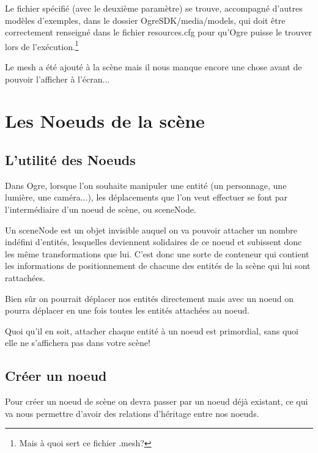 \documentclass[10pt,a4paper]{report}
\begin{document}
Le fichier sp\'ecifi\'e (avec le deuxi\`eme param\`etre) se trouve, accompagn\'e d'autres mod\`eles d'exemples, dans le dossier OgreSDK/media/models, qui doit \^etre correctement renseign\'e dans le fichier resources.cfg pour qu'Ogre puisse le trouver lors de l'ex\'ecution.\footnote{Mais \`a quoi sert ce fichier .mesh?}

Le mesh a \'et\'e ajout\'e \`{a} la sc\`ene mais il nous manque encore une chose avant de pouvoir l'afficher \`{a} l'\'ecran...













\section{Les Noeuds de la sc\`ene}



\subsection{L'utilit\'e des Noeuds}

Dans Ogre, lorsque l'on souhaite manipuler une entit\'e (un personnage, une lumi\`ere, une cam\'era...), les d\'eplacements que l'on veut effectuer se font par l'interm\'ediaire d'un noeud de sc\`ene, ou sceneNode.

Un sceneNode est un objet invisible auquel on va pouvoir attacher un nombre ind\'efini d'entit\'es, lesquelles deviennent solidaires de ce noeud et subissent donc les m\^eme transformations que lui. C'est donc une sorte de conteneur qui contient les informations de positionnement de chacune des entit\'es de la sc\`ene qui lui sont rattach\'ees.

Bien s\^ur on pourrait d\'eplacer nos entit\'es directement mais avec un noeud on pourra d\'eplacer en une fois toutes les entit\'es attach\'ees au noeud.

Quoi qu'il en soit, attacher chaque entit\'e \`{a} un noeud est primordial, sans quoi elle ne s'affichera pas dans votre sc\`ene!



\subsection{Cr\'eer un noeud}

Pour cr\'eer un noeud de sc\`ene on devra passer par un noeud d\'ej\`{a} existant, ce qui va nous permettre d'avoir des relations d'h\'eritage entre nos noeuds.\newline
\end{document}
